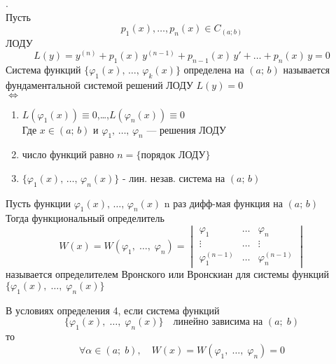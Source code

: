 \begin{Def}.\\
    Пусть 
    \[
        p_1(x),\dots,p_n(x)\in C_{(a;b)}
    \]
    ЛОДУ 
    \[
        L(y)=y^{(n)} + p_1(x)\,y^{(n-1)} + p_{n-1}(x)\,y' + \dots + p_n(x)\,y=0
    \]
    Система функций  $\{ \varphi_1(x),\, \dots,\, \varphi_k(x)\}$ определена на $(a;\,b)$ 
    называется фундаментальной системой решений ЛОДУ $L(y)=0$\\
    $\Leftrightarrow$
    \begin{enumerate}
        \item $L(\varphi_1(x))\equiv 0$,\dots,$L(\varphi_n(x))\equiv 0$\\
        Где $x \in (a;\,b) $ и $ \varphi_1,\, \dots,\, \varphi_n$ --- решения ЛОДУ
        
        \item число функций равно $n = \{\text{порядок ЛОДУ}\}$
        
        \item $\{ \varphi_1(x),\, \dots,\, \varphi_n(x)\}$ - лин. незав. система на $(a;\,b)$
    \end{enumerate}
\end{Def}

\begin{Def}
    Пусть функции $ \varphi_1(x),\, \dots,\, \varphi_n(x)$ n раз дифф-мая функция на $(a;\,b)$\\
    Тогда функциональный определитель
    \[
        W(x)=W(\varphi_1,\;\dots,\;\varphi_n) = 
        \begin{vmatrix} 
            \varphi_1 &\dots & \varphi_n\\ 
            \vdots& \dots &\vdots\\
            \varphi_1^{(n-1)} & \dots &\varphi_n^{(n-1)} 
        \end{vmatrix}
    \]
    называется определителем Вронского или Вронскиан для системы функций $\{\varphi_1(x),\;\dots,\;\varphi_n(x)\}$
\end{Def}

\begin{Th}
    В условиях определения 4, если система функций
    \[
        \{\varphi_1(x),\; \dots,\; \varphi_n(x)\} \quad \text{линейно зависима на } (a;\;b)
    \]
    то
    \[
        \forall \alpha \in (a;\;b), \quad W(x) = W(\varphi_1,\;\dots,\;\varphi_n)=0
    \]
    
    
\end{Th}

